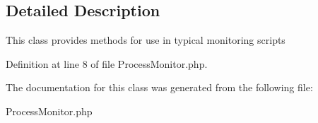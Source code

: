 \subsection{Detailed Description}
This class provides methods for use in typical monitoring scripts 



Definition at line 8 of file Process\-Monitor.php.

The documentation for this class was generated from the following file:\begin{CompactItemize}
\item 
Process\-Monitor.php\end{CompactItemize}
